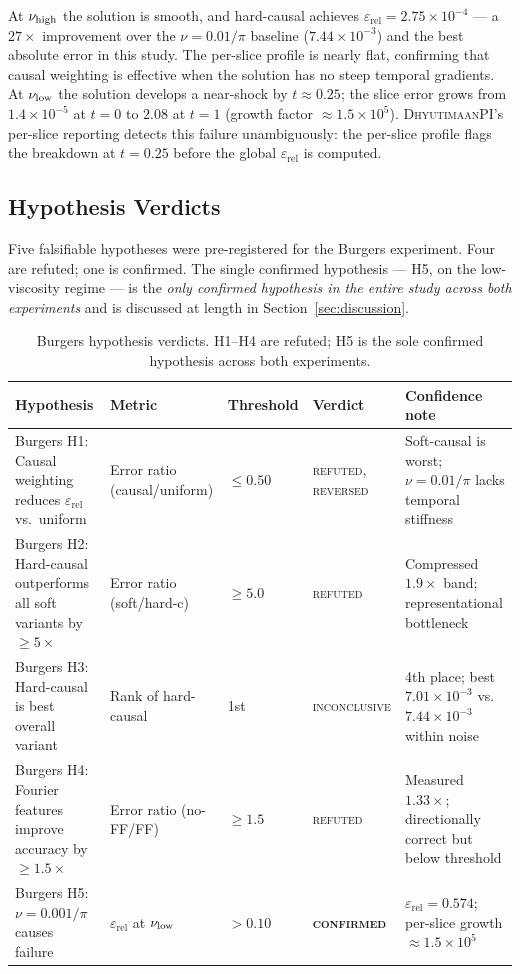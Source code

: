 \documentclass{article}
\newcommand{\dhyutimaan}{\textsc{DhyutimaanPI}}
\newcommand{\relL}{\varepsilon_{\mathrm{rel}}}
\begin{document}
At $\nu_{\rm high}$ the solution is smooth, and hard-causal achieves
$\relL=2.75\times10^{-4}$ — a $27\times$ improvement over the $\nu=0.01/\pi$
baseline ($7.44\times10^{-3}$) and the best absolute error in this study.
The per-slice profile is nearly flat, confirming that causal weighting is
effective when the solution has no steep temporal gradients.
At $\nu_{\rm low}$ the solution develops a near-shock by $t\approx0.25$;
the slice error grows from $1.4\times10^{-5}$ at $t=0$ to $2.08$ at $t=1$
(growth factor $\approx 1.5\times10^{5}$).
\dhyutimaan{}'s per-slice reporting detects this failure unambiguously:
the per-slice profile flags the breakdown at $t=0.25$ before the global
$\relL$ is computed.

\subsection{Hypothesis Verdicts}
\label{sec:burgers_verdicts}

Five falsifiable hypotheses were pre-registered for the Burgers experiment.
Four are refuted; one is confirmed.
The single confirmed hypothesis — H5, on the low-viscosity regime — is the
\emph{only confirmed hypothesis in the entire study across both experiments}
and is discussed at length in Section~\ref{sec:discussion}.

\begin{table}[h]
\centering
\caption{Burgers hypothesis verdicts.
H1--H4 are refuted; H5 is the sole confirmed hypothesis across both experiments.}
\label{tab:burgers_hypotheses}
\small
\begin{tabular}{p{3.8cm}p{1.6cm}p{1.8cm}p{1.6cm}p{2.8cm}}
\toprule
Hypothesis & Metric & Threshold & Verdict & Confidence note \\
\midrule
Burgers H1: Causal weighting reduces $\relL$ vs.\ uniform
  & Error ratio (causal/uniform) & $\leq 0.50$ & \textsc{refuted, reversed}
  & Soft-causal is worst; $\nu=0.01/\pi$ lacks temporal stiffness \\
Burgers H2: Hard-causal outperforms all soft variants by ${\geq}5\times$
  & Error ratio (soft/hard-c) & $\geq 5.0$ & \textsc{refuted}
  & Compressed $1.9\times$ band; representational bottleneck \\
Burgers H3: Hard-causal is best overall variant
  & Rank of hard-causal & 1st & \textsc{inconclusive}
  & 4th place; best $7.01\times10^{-3}$ vs.\ $7.44\times10^{-3}$ within noise \\
Burgers H4: Fourier features improve accuracy by ${\geq}1.5\times$
  & Error ratio (no-FF/FF) & $\geq 1.5$ & \textsc{refuted}
  & Measured $1.33\times$; directionally correct but below threshold \\
Burgers H5: $\nu=0.001/\pi$ causes failure
  & $\relL$ at $\nu_{\rm low}$ & $> 0.10$ & \textbf{\textsc{confirmed}}
  & $\relL=0.574$; per-slice growth ${\approx}1.5\times10^5$ \\
\bottomrule
\end{tabular}
\end{table}
\end{document}
